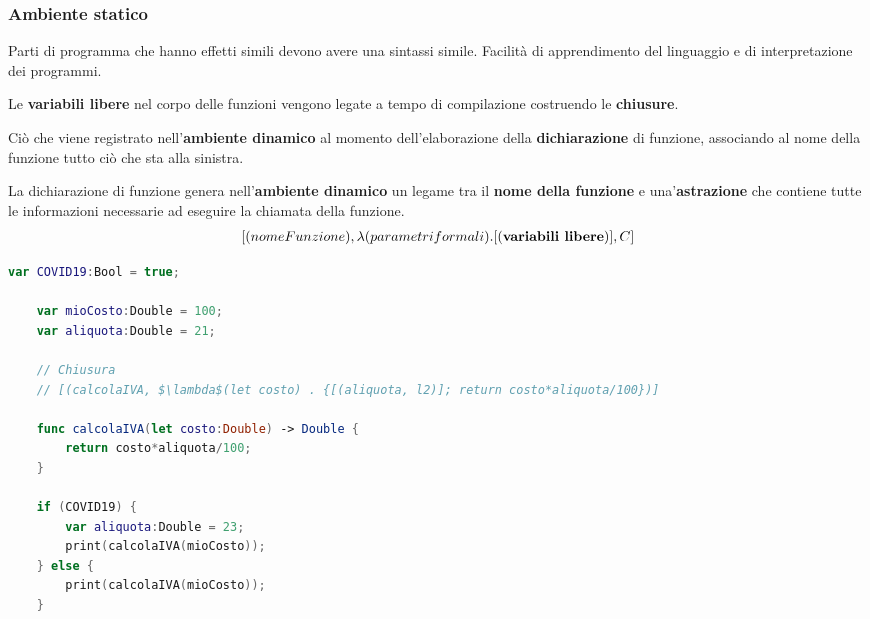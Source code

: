 \subsubsection{Ambiente statico}
\begin{definition}
	Parti di programma che hanno effetti simili devono avere una sintassi simile. Facilità di apprendimento del linguaggio e di interpretazione dei programmi.
\end{definition}
\begin{definition}
	Le \textbf{variabili libere} nel corpo delle funzioni vengono legate a tempo di compilazione costruendo le \textbf{chiusure}.
\end{definition}
\begin{definition}[Chiusura]
	Ciò che viene registrato nell'\textbf{ambiente dinamico} al momento  dell'elaborazione della \textbf{dichiarazione} di funzione, associando al nome della funzione tutto ciò che sta alla sinistra.
\end{definition}
La dichiarazione di funzione genera nell’\textbf{ambiente dinamico} un legame tra il \textbf{nome della funzione} e una'\textbf{astrazione} che contiene tutte le informazioni necessarie ad eseguire la chiamata della funzione.
\begin{align}
	\centering
	[(nomeFunzione), \lambda(parametri formali) . {[(\textbf{variabili libere})], C}]
\end{align}
\begin{lstlisting}[language=Swift, caption=Esempio di scoping statico, mathescape=true]
	var COVID19:Bool = true;
	
	var mioCosto:Double = 100;
	var aliquota:Double = 21;
	
	// Chiusura
	// [(calcolaIVA, $\lambda$(let costo) . {[(aliquota, l2)]; return costo*aliquota/100})]
	
	func calcolaIVA(let costo:Double) -> Double {
		return costo*aliquota/100;
	}

	if (COVID19) {
		var aliquota:Double = 23;
		print(calcolaIVA(mioCosto));
	} else {
		print(calcolaIVA(mioCosto));
	}
\end{lstlisting}
